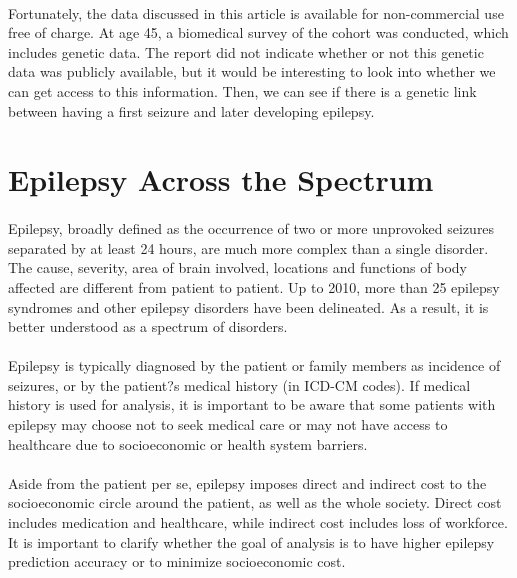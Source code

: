 \documentclass[10pt,letter]{article}
\begin{document}
\paragraph{} Fortunately, the data discussed in this article is available for non-commercial use free of charge. At age 45, a biomedical survey of the cohort was conducted, which includes genetic data. The report did not indicate whether or not this genetic data was publicly available, but it would be interesting to look into whether we can get access to this information. Then, we can see if there is a genetic link between having a first seizure and later developing epilepsy.

\section{Epilepsy Across the Spectrum}

\paragraph{} Epilepsy, broadly defined as the occurrence of two or more unprovoked seizures separated by at least 24 hours, are much more complex than a single disorder. The cause, severity, area of brain involved, locations and functions of body  affected are different from patient to patient. Up to 2010, more than 25 epilepsy syndromes and other epilepsy disorders have been delineated. As a result, it is better understood as a spectrum of disorders.

\paragraph{} Epilepsy is typically diagnosed by the patient or family members as incidence of seizures, or by the patient?s medical history (in ICD-CM codes). If medical history is used for analysis, it is important to be aware that some patients with epilepsy may choose not to seek medical care or may not have access to healthcare due to socioeconomic or health system barriers.

\paragraph{} Aside from the patient per se, epilepsy imposes direct and indirect cost to the socioeconomic circle around the patient, as well as the whole society. Direct cost includes medication and healthcare, while indirect cost includes loss of workforce. It is important to clarify whether the goal of analysis is to have higher epilepsy prediction accuracy or to minimize socioeconomic cost.
\end{document}
